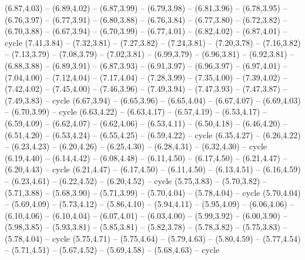 \expandafter\def\csname geo:gebiet:GRC\endcsname{
  (6.87,4.03) -- (6.89,4.02) -- (6.87,3.99) -- (6.79,3.98) -- (6.81,3.96) -- (6.78,3.95) -- (6.76,3.97) -- (6.77,3.91) -- (6.80,3.88) -- (6.76,3.84) -- (6.77,3.80) -- (6.72,3.82) -- (6.70,3.88) -- (6.67,3.94) -- (6.70,3.99) -- (6.77,4.01) -- (6.82,4.02) -- (6.87,4.01) -- cycle}
\expandafter\def\csname geo:gebiet:TUR\endcsname{
  (7.41,3.84) -- (7.32,3.81) -- (7.27,3.82) -- (7.24,3.81) -- (7.20,3.78) -- (7.16,3.82) -- (7.13,3.79) -- (7.08,3.79) -- (7.02,3.81) -- (6.99,3.79) -- (6.96,3.81) -- (6.92,3.81) -- (6.88,3.88) -- (6.89,3.91) -- (6.87,3.93) -- (6.91,3.97) -- (6.96,3.97) -- (6.97,4.01) -- (7.04,4.00) -- (7.12,4.04) -- (7.17,4.04) -- (7.28,3.99) -- (7.35,4.00) -- (7.39,4.02) -- (7.42,4.02) -- (7.45,4.00) -- (7.46,3.96) -- (7.49,3.94) -- (7.47,3.93) -- (7.47,3.87) -- (7.49,3.83) -- cycle}
\expandafter\def\csname geo:gebiet:ALB\endcsname{
  (6.67,3.94) -- (6.65,3.96) -- (6.65,4.04) -- (6.67,4.07) -- (6.69,4.03) -- (6.70,3.99) -- cycle}
\expandafter\def\csname geo:gebiet:HRV\endcsname{
  (6.63,4.22) -- (6.63,4.17) -- (6.57,4.19) -- (6.53,4.17) -- (6.59,4.09) -- (6.62,4.07) -- (6.62,4.06) -- (6.53,4.11) -- (6.50,4.18) -- (6.46,4.20) -- (6.51,4.20) -- (6.53,4.24) -- (6.55,4.25) -- (6.59,4.22) -- cycle}
\expandafter\def\csname geo:gebiet:CHE\endcsname{
  (6.35,4.27) -- (6.26,4.22) -- (6.23,4.23) -- (6.20,4.26) -- (6.25,4.30) -- (6.28,4.31) -- (6.32,4.30) -- cycle}
\expandafter\def\csname geo:gebiet:LUX\endcsname{
  }
\expandafter\def\csname geo:gebiet:BEL\endcsname{
  (6.19,4.40) -- (6.14,4.42) -- (6.08,4.48) -- (6.11,4.50) -- (6.17,4.50) -- (6.21,4.47) -- (6.20,4.43) -- cycle}
\expandafter\def\csname geo:gebiet:NLD\endcsname{
  (6.21,4.47) -- (6.17,4.50) -- (6.11,4.50) -- (6.13,4.51) -- (6.16,4.59) -- (6.23,4.61) -- (6.22,4.52) -- (6.20,4.52) -- cycle}
\expandafter\def\csname geo:gebiet:PRT\endcsname{
  (5.75,3.83) -- (5.70,3.82) -- (5.71,3.88) -- (5.68,3.90) -- (5.71,3.99) -- (5.70,4.04) -- (5.78,4.04) -- cycle}
\expandafter\def\csname geo:gebiet:ESP\endcsname{
  (5.70,4.04) -- (5.69,4.09) -- (5.73,4.12) -- (5.86,4.10) -- (5.94,4.11) -- (5.95,4.09) -- (6.06,4.06) -- (6.10,4.06) -- (6.10,4.04) -- (6.07,4.01) -- (6.03,4.00) -- (5.99,3.92) -- (6.00,3.90) -- (5.98,3.85) -- (5.93,3.81) -- (5.85,3.81) -- (5.82,3.78) -- (5.78,3.82) -- (5.75,3.83) -- (5.78,4.04) -- cycle}
\expandafter\def\csname geo:gebiet:IRL\endcsname{
  (5.75,4.71) -- (5.75,4.64) -- (5.79,4.63) -- (5.80,4.59) -- (5.77,4.54) -- (5.71,4.51) -- (5.67,4.52) -- (5.69,4.58) -- (5.68,4.63) -- cycle}
